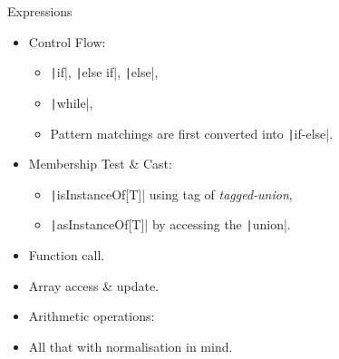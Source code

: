\documentclass[xcolor={usenames,dvipsnames}]{beamer}
\newcommand{\InlineC}[1]{\texttt|#1|}
\newcommand{\InlineS}[1]{\texttt|#1|}
\begin{document}
\begin{frame}[fragile]{Expressions}

  \begin{itemize}

    \item Control Flow:
      \begin{itemize}
        \item \InlineS{if}, \InlineS{else if}, \InlineS{else},
        \item \InlineS{while},
        \item Pattern matchings are first converted into \InlineS{if-else}.
      \end{itemize}


    \item Membership Test \& Cast:
      \begin{itemize}
        \item \InlineS{isInstanceOf[T]} using tag of \emph{tagged-union},
        \item \InlineS{asInstanceOf[T]} by accessing the \InlineC{union}.
      \end{itemize}


    \item Function call.


    \item Array access \& update.


    \item Arithmetic operations:


    \item All that with \alert{normalisation} in mind.

  \end{itemize}

\end{frame}
\end{document}
